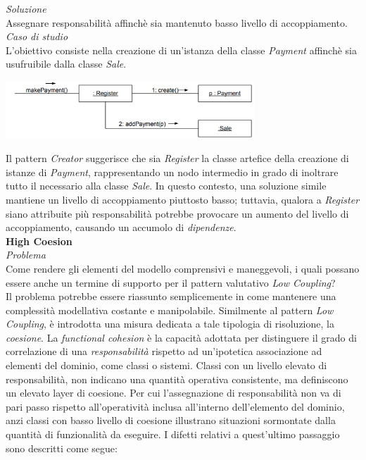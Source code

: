 \documentclass{article}
\begin{document}
\textit{Soluzione}\\
Assegnare responsabilità affinchè sia mantenuto basso livello di accoppiamento.\vspace*{14pt}\\
\textit{Caso di studio}\\
L'obiettivo consiste nella creazione di un'istanza della classe \textit{Payment} affinchè sia usufruibile dalla classe \textit{Sale}.\vspace*{7pt}
\begin{center}
    \includegraphics*[width=0.7\textwidth]{foto 3.png}
\end{center} 
Il pattern \textit{Creator} suggerisce che sia \textit{Register} la classe artefice della creazione di istanze di \textit{Payment}, rappresentando un nodo intermedio in grado di inoltrare tutto il necessario alla classe \textit{Sale}. In questo contesto, una soluzione simile mantiene un livello di accoppiamento piuttosto basso; tuttavia, qualora a \textit{Register} siano attribuite più responsabilità potrebbe provocare un aumento del livello di accoppiamento, causando un accumolo di \textit{dipendenze}.\vspace*{14pt}\\
\textbf{High Coesion}\vspace*{7pt}\\
\textit{Problema}\\
Come rendere gli elementi del modello comprensivi e maneggevoli, i quali possano essere anche un termine di supporto per il pattern valutativo \textit{Low Coupling}?\vspace*{14pt}\\
Il problema potrebbe essere riassunto semplicemente in come mantenere una complessità modellativa costante e manipolabile. Similmente al pattern \textit{Low Coupling}, è introdotta una misura dedicata a tale tipologia di risoluzione, la \textit{coesione}. La \textit{functional cohesion} è la capacità adottata per distinguere il grado di correlazione di una \textit{responsabilità} rispetto ad un'ipotetica associazione ad elementi del dominio, come classi o sistemi. Classi con un livello elevato di responsabilità, non indicano una quantità operativa consistente, ma definiscono un elevato layer di coesione. Per cui l'assegnazione di responsabilità non va di pari passo rispetto all'operatività inclusa all'interno dell'elemento del dominio, anzi classi con basso livello di coesione illustrano situazioni sormontate dalla quantità di funzionalità da eseguire. I difetti relativi a quest'ultimo passaggio sono descritti come segue:
\end{document}
